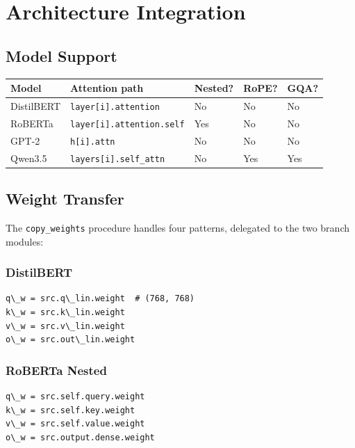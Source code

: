 \section{Architecture Integration}

\subsection{Model Support}

\begin{table}[H]
\centering
\small
\begin{tabular}{lllll}
\toprule
\textbf{Model} & \textbf{Attention path} & \textbf{Nested?} & \textbf{RoPE?} & \textbf{GQA?} \\
\midrule
DistilBERT & \texttt{layer[i].attention} & No & No & No \\
RoBERTa & \texttt{layer[i].attention.self} & Yes & No & No \\
GPT-2 & \texttt{h[i].attn} & No & No & No \\
Qwen3.5 & \texttt{layers[i].self\_attn} & No & Yes & Yes \\
\bottomrule
\end{tabular}
\end{table}

\subsection{Weight Transfer}

The \texttt{copy\_weights} procedure handles four patterns, delegated to the two 
branch modules:

\subsubsection{DistilBERT}

\begin{lstlisting}
q\_w = src.q\_lin.weight  # (768, 768)
k\_w = src.k\_lin.weight
v\_w = src.v\_lin.weight
o\_w = src.out\_lin.weight
\end{lstlisting}

\subsubsection{RoBERTa Nested}

\begin{lstlisting}
q\_w = src.self.query.weight
k\_w = src.self.key.weight
v\_w = src.self.value.weight
o\_w = src.output.dense.weight
\end{lstlisting}

